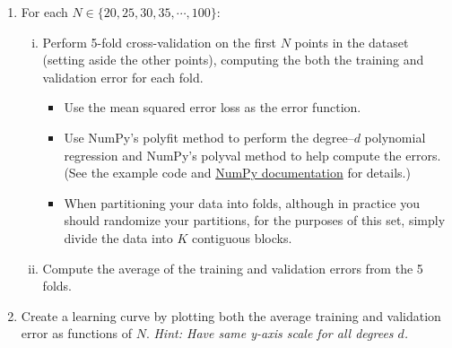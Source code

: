 \begin{problem}[14]
  \begin{enumerate}
    \item For each $N \in \{20, 25, 30, 35, \cdots, 100\}$:
    \begin{enumerate}[i.]
      \item Perform 5-fold cross-validation on the first $N$ points in the dataset (setting aside the other points), computing the both the training and validation error for each fold. 
      \begin{itemize}
        \item Use the mean squared error loss as the error function.
        \item Use NumPy's polyfit method to perform the degree--$d$ polynomial regression and NumPy's polyval method to help compute the errors.  (See the example code and \href{https://docs.scipy.org/doc/NumPy/reference/routines.polynomials.poly1d.html}{NumPy documentation} for details.)
        \item When partitioning your data into folds, although in practice you should randomize your partitions, for the purposes of this set, simply divide the data into $K$ contiguous blocks.
      \end{itemize}
      \item Compute the average of the training and validation errors from the 5 folds.
    \end{enumerate}
    \item Create a learning curve by plotting both the average training and validation error as functions of $N$. \textit{Hint: Have same y-axis scale for all degrees $d$.}
  \end{enumerate}

\end{problem}
